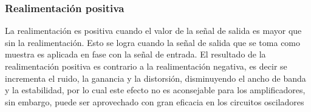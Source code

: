 \subsubsection{Realimentación positiva}

La realimentación es positiva cuando el valor de la señal de salida es mayor que sin
la realimentación. Esto se logra cuando la señal de salida que se toma como muestra es
aplicada en fase con la señal de entrada.
El resultado de la realimentación positiva es contrario a la realimentación negativa, es
decir se incrementa el ruido, la ganancia y la distorsión, disminuyendo el ancho de banda y
la estabilidad, por lo cual este efecto no es aconsejable para los amplificadores, sin embargo,
puede ser aprovechado con gran eficacia en los circuitos osciladores
